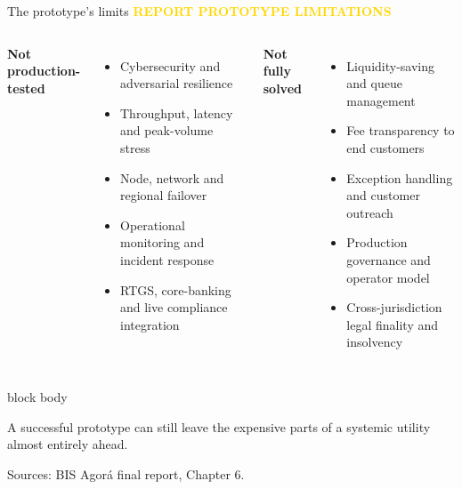 \documentclass[aspectratio=169,12pt]{beamer}
\newcommand{\rust}[1]{\textcolor{Rust}{\textbf{#1}}}
\newcommand{\blue}[1]{\textcolor{Ocean}{\textbf{#1}}}
\newcommand{\source}[1]{\vfill\par\fontsize{5.4}{6.5}\selectfont\color{Quiet}Sources: #1}
\newcommand{\verytightitems}{\setlength{\itemsep}{0.22em}\setlength{\parskip}{0pt}}
\newcommand{\reporttag}[1]{\textcolor{Gold}{\fontsize{7.2}{8.5}\selectfont\bfseries REPORT #1}}
\newenvironment{statement}{%
  \begin{beamercolorbox}[sep=.18cm,rounded=false,wd=\linewidth]{block body}%
  \fontsize{13}{15.5}\selectfont\bfseries
}{\end{beamercolorbox}}
\begin{document}
\begin{frame}[shrink=30]{The prototype's limits}
  \reporttag{PROTOTYPE LIMITATIONS}\par\vspace{0.08cm}
  \begin{columns}[T,onlytextwidth]
      \rust{Not production-tested}
      \begin{itemize}\verytightitems
        \item Cybersecurity and adversarial resilience
        \item Throughput, latency and peak-volume stress
        \item Node, network and regional failover
        \item Operational monitoring and incident response
        \item RTGS, core-banking and live compliance integration
      \end{itemize}
      \blue{Not fully solved}
      \begin{itemize}\verytightitems
        \item Liquidity-saving and queue management
        \item Fee transparency to end customers
        \item Exception handling and customer outreach
        \item Production governance and operator model
        \item Cross-jurisdiction legal finality and insolvency
      \end{itemize}
  \end{columns}
  \begin{statement}
    A successful prototype can still leave the expensive parts of a systemic utility almost entirely ahead.
  \end{statement}
  \source{BIS Agor\'a final report, Chapter 6.}
\end{frame}
\end{document}
